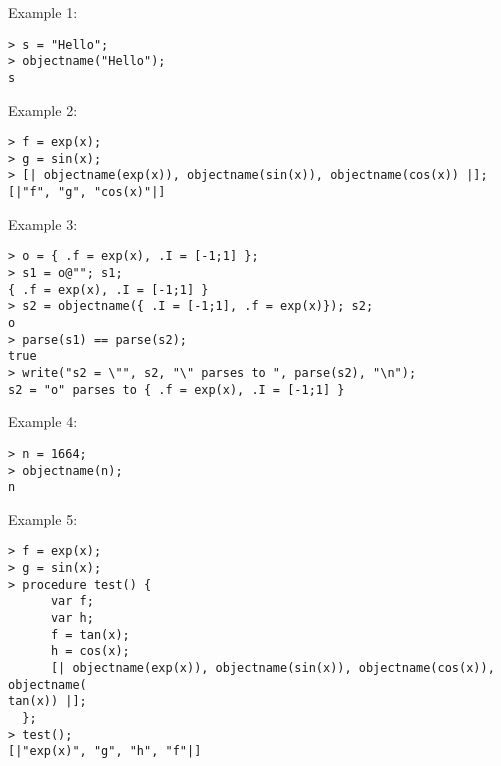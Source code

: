 \noindent Example 1: 
\begin{center}\begin{minipage}{15cm}\begin{Verbatim}[frame=single,commandchars=\\\|\~]
> s = "Hello";
> objectname("Hello");
s
\end{Verbatim}
\end{minipage}\end{center}
\noindent Example 2: 
\begin{center}\begin{minipage}{15cm}\begin{Verbatim}[frame=single,commandchars=\\\|\~]
> f = exp(x);
> g = sin(x);
> [| objectname(exp(x)), objectname(sin(x)), objectname(cos(x)) |];
[|"f", "g", "cos(x)"|]
\end{Verbatim}
\end{minipage}\end{center}
\noindent Example 3: 
\begin{center}\begin{minipage}{15cm}\begin{Verbatim}[frame=single,commandchars=\\\|\~]
> o = { .f = exp(x), .I = [-1;1] };
> s1 = o@""; s1;
{ .f = exp(x), .I = [-1;1] }
> s2 = objectname({ .I = [-1;1], .f = exp(x)}); s2;
o
> parse(s1) == parse(s2);
true
> write("s2 = \"", s2, "\" parses to ", parse(s2), "\n");
s2 = "o" parses to { .f = exp(x), .I = [-1;1] }
\end{Verbatim}
\end{minipage}\end{center}
\noindent Example 4: 
\begin{center}\begin{minipage}{15cm}\begin{Verbatim}[frame=single,commandchars=\\\|\~]
> n = 1664;
> objectname(n);
n
\end{Verbatim}
\end{minipage}\end{center}
\noindent Example 5: 
\begin{center}\begin{minipage}{15cm}\begin{Verbatim}[frame=single,commandchars=\\\|\~]
> f = exp(x);
> g = sin(x);
> procedure test() {
      var f;
      var h;
      f = tan(x);
      h = cos(x);
      [| objectname(exp(x)), objectname(sin(x)), objectname(cos(x)), objectname(
tan(x)) |];
  };
> test();
[|"exp(x)", "g", "h", "f"|]
\end{Verbatim}
\end{minipage}\end{center}
